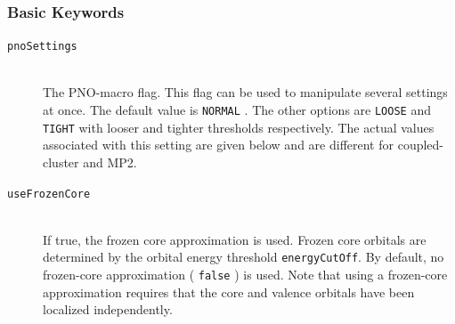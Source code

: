 \documentclass[bibliography=totocnumbered,a4paper,10pt,oneside]{scrbook}
\newcommand{\ttt}[1]{%
  \begingroup\setlength{\fboxsep}{1pt}%
  \colorbox{serenity-green!30}{\texttt{\hspace*{2pt}\vphantom{(g}#1\hspace*{2pt}}}%
  \endgroup
}
\begin{document}
\subsubsection{Basic Keywords}
\begin{description}
  \item [\texttt{pnoSettings}]\hfill \\
  The PNO-macro flag. This flag can be used to manipulate several settings at once. The default value is
  \ttt{NORMAL}. The other options are \ttt{LOOSE} and \ttt{TIGHT} with looser and tighter thresholds
  respectively. The actual values associated with this setting are given below and are different for
  coupled-cluster and MP2.
 \item [\texttt{useFrozenCore}]\hfill \\
 If true, the frozen core approximation is used. Frozen core orbitals are determined by the orbital energy
 threshold \texttt{energyCutOff}. By default, no frozen-core approximation (\ttt{false}) is used. Note
 that using a frozen-core approximation requires that the core and valence orbitals have been localized
 independently.
\end{description}
\end{document}
